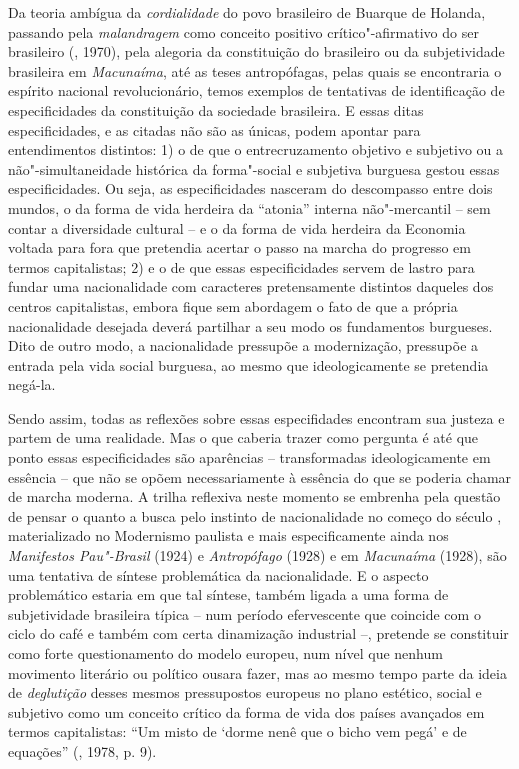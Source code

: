 Da teoria ambígua da \emph{cordialidade} do povo brasileiro de Buarque
de Holanda, passando pela \emph{malandragem} como conceito positivo
crítico"-afirmativo do ser brasileiro (, 1970), pela alegoria da
constituição do brasileiro ou da subjetividade brasileira em
\emph{Macunaíma}, até as teses antropófagas, pelas quais se encontraria
o espírito nacional revolucionário, temos exemplos de tentativas de
identificação de especificidades da constituição da sociedade
brasileira. E essas ditas especificidades, e as citadas não são as
únicas, podem apontar para entendimentos distintos: 1) o de que o
entrecruzamento objetivo e subjetivo ou a não"-simultaneidade histórica
da forma"-social e subjetiva burguesa gestou essas especificidades. Ou
seja, as especificidades nasceram do descompasso entre dois
mundos, o da forma de vida herdeira da ``atonia'' interna não"-mercantil
-- sem contar a diversidade cultural -- e o da forma de vida herdeira da
Economia voltada para fora que pretendia acertar o passo na marcha do
progresso em termos capitalistas; 2) e o de que essas especificidades servem de
lastro para fundar uma nacionalidade com caracteres pretensamente
distintos daqueles dos centros capitalistas, embora fique sem abordagem
o fato de que a própria nacionalidade desejada deverá partilhar a seu
modo os fundamentos burgueses. Dito de outro modo, a nacionalidade
pressupõe a modernização, pressupõe a entrada pela vida social burguesa,
ao mesmo que ideologicamente se pretendia negá-la.

Sendo assim, todas as reflexões sobre essas especifidades
encontram sua justeza e partem de uma
realidade. Mas o que caberia trazer como pergunta é até que ponto essas
especificidades são aparências -- transformadas ideologicamente em
essência -- que não se opõem necessariamente à essência do que se
poderia chamar de marcha moderna. A trilha reflexiva neste momento
se embrenha pela questão de pensar o quanto a busca pelo
instinto de nacionalidade no começo do século , materializado no
Modernismo paulista e mais especificamente ainda nos \emph{Manifestos
Pau"-Brasil} (1924) e \emph{Antropófago} (1928) e em \emph{Macunaíma}
(1928), são uma tentativa de síntese problemática da nacionalidade. E o
aspecto problemático estaria em que tal síntese, também ligada a uma
forma de subjetividade brasileira típica -- num período efervescente que
coincide com o ciclo do café e também com certa dinamização industrial
--, pretende se constituir como forte questionamento do modelo europeu,
num nível que nenhum movimento literário ou político ousara fazer, mas
ao mesmo tempo parte da ideia de \emph{deglutição} desses mesmos
pressupostos europeus no plano estético, social e subjetivo como um
conceito crítico da forma de vida dos países avançados em termos
capitalistas: ``Um misto de `dorme nenê que o bicho vem pegá' e de
equações'' (, 1978, p. 9).

